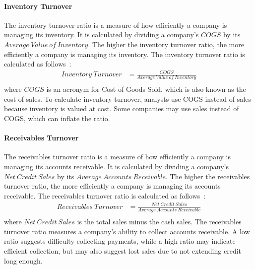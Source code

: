 \documentclass[../xlapes02]{subfiles}
\begin{document}
    \paragraph{Inventory Turnover}\label{par:inventory-turnover}
    The inventory turnover ratio is a measure of how efficiently a company is managing its inventory. It is calculated by dividing a company's $COGS$ by its $Average\ Value\ of\ Inventory$. The higher the inventory turnover ratio, the more efficiently a company is managing its inventory. The inventory turnover ratio is calculated as follows~\cite{investopedia}:
    \begin{equation}
        \begin{split}
            Inventory\ Turnover&=\frac{COGS}{Average\ Value\ of\ Inventory}\\
        \end{split}
    \end{equation}
    where $COGS$ is an acronym for Cost of Goods Sold, which is also known as the cost of sales. To calculate inventory turnover, analysts use COGS instead of sales because inventory is valued at cost. Some companies may use sales instead of COGS, which can inflate the ratio.

    \paragraph{Receivables Turnover}\label{par:receivables-turnover}
    The receivables turnover ratio is a measure of how efficiently a company is managing its accounts receivable. It is calculated by dividing a company's $Net\ Credit\ Sales$ by its $Average\ Accounts\ Receivable$. The higher the receivables turnover ratio, the more efficiently a company is managing its accounts receivable. The receivables turnover ratio is calculated as follows~\cite{investopedia}:
    \begin{equation}
        \begin{split}
            Receivables\ Turnover&=\frac{Net\ Credit\ Sales}{Average\ Accounts\ Receivable}\\
        \end{split}
    \end{equation}
    where $Net\ Credit\ Sales$ is the total sales minus the cash sales. The receivables turnover ratio measures a company's ability to collect accounts receivable. A low ratio suggests difficulty collecting payments, while a high ratio may indicate efficient collection, but may also suggest lost sales due to not extending credit long enough.
\end{document}
